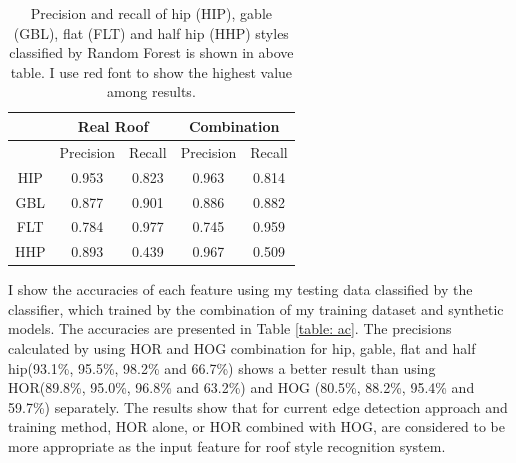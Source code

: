 \documentclass{iitthesis}
\begin{document}
\begin{table}[t]
\caption{Precision and recall of hip (HIP), gable (GBL), flat (FLT) and half hip (HHP) styles classified by Random Forest is shown in above table. I use red font to show the highest value among results.}
    \centering
    \scalebox{1.0}
    {
        \begin{tabular}{ccccc}
            \hline \hline
            &\multicolumn{2}{c}{{Real Roof}} & \multicolumn{2}{c}{{Combination}}\\ 
            \hline
            
            &\multicolumn{1}{c}{{Precision}} & \multicolumn{1}{c}{{Recall}} & \multicolumn{1}{c}{{Precision}} & \multicolumn{1}{c}{{Recall}}\\

            
            HIP & 0.953 & 0.823 & 0.963 & 0.814 \\

            
            GBL & 0.877 & 0.901 & 0.886 & 0.882 \\

            
            FLT & 0.784 & 0.977 & 0.745 & 0.959 \\

            
            HHP & 0.893 & 0.439 & 0.967 & 0.509 \\              
            \hline
            
        \end{tabular}
    }
    \label{table: pr}
\end{table}

I show the accuracies of each feature using my testing data classified by the classifier, which trained by the combination of my training
dataset and synthetic models. The accuracies are presented in Table \ref{table: ac}. The precisions calculated by using HOR and HOG combination for hip, gable, flat and half hip(93.1\%, 95.5\%, 98.2\% and 66.7\%) shows a better result than using HOR(89.8\%, 95.0\%, 96.8\% and 63.2\%) and HOG (80.5\%, 88.2\%, 95.4\% and 59.7\%) separately. The results show that for current edge detection approach and training method, HOR alone, or HOR combined with HOG, are considered to be more appropriate as the input feature for roof style recognition system.
\end{document}
